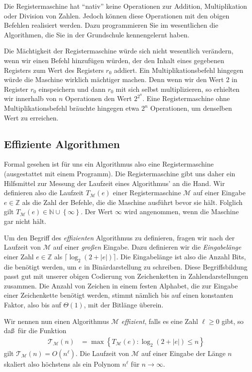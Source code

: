 \documentclass[10pt,reqno]{amsart}
\numberwithin{equation}{section}
\newcommand\cM{\mathcal M}
\newcommand\cT{\mathcal T}
\newcommand\NN{\mathbb N}
\newcommand\ZZ{\mathbb Z}
\newcommand\cbc[1]{\left\{{#1}\right\}}
\begin{document}
Die Registermaschine hat ``nativ'' keine Operationen zur Addition, Multiplikation oder Division von Zahlen.
Jedoch k\"onnen diese Operationen mit den obigen Befehlen realisiert werden.
Dazu programmieren Sie im wesentlichen die Algorithmen, die Sie in der Grundschule kennengelernt haben.

Die M\"achtigkeit der Registermaschine w\"urde sich nicht wesentlich ver\"andern, wenn wir einen Befehl hinzuf\"ugen w\"urden, der den Inhalt eines gegebenen Registers zum Wert des Registers $r_0$ addiert.
Ein Multiplikationsbefehl hingegen w\"urde die Maschine wirklich m\"achtiger machen.
Denn wenn wir den Wert $2$ in Register $r_0$ einspeichern und dann $r_0$ mit sich selbst multiplizieren, so erhielten wir innerhalb von $n$ Operationen den Wert $2^{2^n}$.
Eine Registermaschine ohne Multiplikationsbefehl br\"auchte hingegen etwa $2^n$ Operationen, um denselben Wert zu erreichen.

\subsection{Effiziente Algorithmen}\label{sec_P}
Formal gesehen ist f\"ur uns ein Algorithmus also eine Registermaschine (ausgestattet mit einem Programm).
Die Registermaschine gibt uns daher ein Hilfsmittel zur Messung der Laufzeit eines Algorithmus' an die Hand.
Wir definieren also die Laufzeit $T_{\cM}(e)$ einer Registermaschine $\cM$ auf einer Eingabe $e\in\ZZ$ als die Zahl der Befehle, die die Maschine ausf\"uhrt bevor sie h\"alt.
Folglich gilt $T_\cM(e)\in\NN\cup\cbc\infty$.
Der Wert $\infty$ wird angenommen, wenn die Maschine gar nicht h\"alt.

Um den Begriff des {\em effizienten} Algorithmus zu definieren, fragen wir nach der Laufzeit von $\cM$ auf einer {\em gro\ss en} Eingabe.
Dazu definieren wir die {\em Eingabel\"ange} einer Zahl $e\in\ZZ$ als $\lceil\log_2(2+|e|)\rceil$.
Die Eingabel\"ange ist also die Anzahl Bits, die ben\"otigt werden, um $e$ in Bin\"ardarstellung zu schreiben.
Diese Begriffsbildung passt gut mit unserer obigen Codierung von Zeichenketten in Zahlendarstellungen zusammen.
Die Anzahl von Zeichen in einem festen Alphabet, die zur Eingabe einer Zeichenkette ben\"otigt werden, stimmt n\"amlich bis auf einen konstanten Faktor, also bis auf $\Theta(1)$, mit der Bitl\"ange \"uberein.

Wir nennen nun einen Algorithmus $\cM$ {\em effizient}, falls es eine Zahl $\ell\geq0$ gibt, so da\ss\ f\"ur die Funktion
\begin{align*}
	\cT_{\cM}(n)&=\max\cbc{T_\cM(e):\log_2(2+|e|)\leq n}
\end{align*}
gilt $\cT_{\cM}(n)=O(n^\ell)$.
Die Laufzeit von $\cM$ auf einer Eingabe der L\"ange $n$ skaliert also h\"ochstens als ein Polynom $n^\ell$ f\"ur $n\to\infty$.
\end{document}
